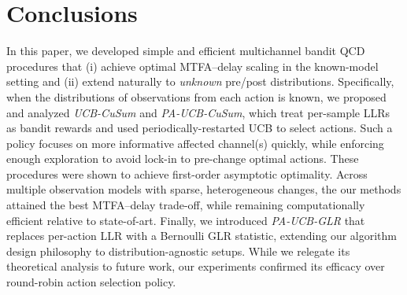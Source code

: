 \documentclass[letterpaper, 10 pt, conference]{ieeeconf}  %
\begin{document}
\section{Conclusions}
In this paper, we developed {simple and efficient} multichannel bandit QCD procedures that (i) achieve optimal MTFA--delay scaling in the known-model setting and (ii) extend naturally to \emph{unknown} pre/post distributions.
Specifically, when the distributions of observations from each action is known, we proposed and analyzed \emph{UCB-CuSum} and \emph{PA-UCB-CuSum}, which treat per-sample LLRs as bandit rewards and used periodically-restarted UCB to select actions. Such a policy focuses  on more informative affected channel(s) quickly, while enforcing enough exploration to avoid lock-in to pre-change optimal actions. These procedures were shown to achieve first-order asymptotic optimality.
Across multiple observation models with sparse, heterogeneous changes, the our methods attained the best MTFA--delay trade-off, while remaining  computationally efficient relative to state-of-art. 
Finally, we introduced \emph{PA-UCB-GLR} that replaces per-action LLR with a Bernoulli GLR statistic, extending our algorithm design philosophy to distribution-agnostic setups. 
While we relegate its theoretical analysis to future work, our experiments confirmed its efficacy over round-robin action selection policy.
\end{document}
